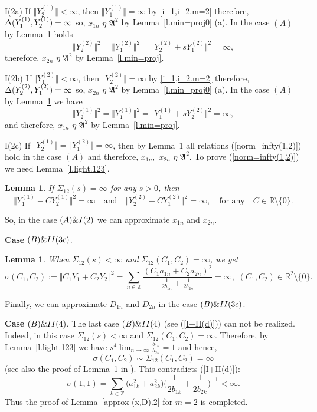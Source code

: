 \documentclass[preprint,12pt]{elsarticle}
\newcommand{\commA}[1]{\marginpar{%
\begin{color}{red}
\vskip-\baselineskip %
\raggedright\footnotesize
\itshape\hrule \smallskip A: #1\par\smallskip\hrule\end{color}}}
\newtheorem{lem}[thm]{Lemma}
\numberwithin{equation}{section}
\begin{document}
I(2a) If $\Vert Y_2^{(1)}\Vert<\infty$, then $\Vert Y_1^{(1)}\Vert=\infty$ by \eqref{i_1,i_2.m=2} therefore, 
$\Delta(Y_1^{(1)},Y_2^{(1)})\\= \infty$
so, $x_{1n}\,\,\eta\,\,{\mathfrak A}^2$ by Lemma~\ref{l.min=proj0} (a). In the case $(A)$ by Lemma~\ref{l.park} holds
$$\Vert Y_2^{(2)} \Vert^2=\Vert Y_1^{(2)} \Vert^2=\Vert Y_2^{(2)} +s Y_1^{(2)} \Vert^2=\infty,$$ therefore, 
$x_{2n}\,\,\eta\,\,{\mathfrak A}^2$ by Lemma~\ref{l.min=proj}.

I(2b) If $\Vert  Y_1^{(2)} \Vert<\infty$, then $\Vert  Y_2^{(2)} \Vert=\infty$ by \eqref{i_1,i_2.m=2} therefore,
$\Delta(Y_2^{(2)},Y_1^{(2)})\\=\infty$ so,
$x_{2n}\,\,\eta\,\,{\mathfrak A}^2$ by Lemma~\ref{l.min=proj0} (a). In the case $(A)$ by Lemma~\ref{l.park} we have
$$\Vert Y_2^{(1)} \Vert^2=\Vert Y_1^{(1)} \Vert^2=\Vert Y_1^{(1)} +s Y_2^{(2)} \Vert^2=\infty,$$
and therefore, $x_{1n}\,\,\eta\,\,{\mathfrak A}^2$ by Lemma~\ref{l.min=proj}.

I(2c) If $\Vert Y_2^{(1)} \Vert=\Vert Y_1^{(2)}\Vert=\infty$, then by Lemma~\ref{l.park} all relations (\ref{norm=infty(1,2)}) hold in the case $(A)$ and
therefore, $x_{1n},\,\,x_{2n}\,\,\eta\,\,{\mathfrak A}^2$.
To prove (\ref{norm=infty(1,2)}) we need Lemma~\ref{l.light.123}.
\begin{lem}
\label{l.park} If $\Sigma_{12}(s)=\infty$ for any $s>0$, then
$$
\Vert Y_1^{(1)}-CY_2^{(1)}\Vert^2=\infty\quad\text{and}\quad \Vert Y_2^{(2)}-CY_1^{(2)}\Vert^2=\infty,\quad\text{for any}\quad 
C\in \mathbb R\setminus\{0\}.
$$
\end{lem}
%
So, in the case ${\rm (A)\&I(2)}$  we can approximate $x_{1n}$ and $x_{2n}$.
%


{\bf Case} ${\rm (B)\&II(3c)}$.
\begin{lem}
\label{the-last} When 
%
$\Sigma_{12}(s)<\infty$ and
$\Sigma_{12}(C_1,C_2)=\infty$,
we get
\begin{equation}
\label{C_1f+C_2g=}
\sigma(C_1,C_2):=
\Vert C_1Y_1+C_2Y_2\Vert^2\!=\!\sum_{n\in {\mathbb Z}}\frac{(C_1a_{1n}+C_2a_{2n})^2}{\frac{1}{2b_{1n}}+\frac{1}{2b_{2n}}}\!=\!\infty,\,\,
(C_1,C_2)\!\in\!{\mathbb R}^2\setminus\{0\}.
\end{equation}
\end{lem}
%
Finally, we can approximate $D_{1n}$ and $D_{2n}$ in the case ${\rm (B)\&II(3c)}$.

{\bf Case} ${\rm (B)\&II(4)}$. The last case  ${\rm (B)\&II(4)}$ (see (\ref{I+II(d)})) can not be realized.
%
Indeed, in this case
$\Sigma_{12}(s)<\infty$ and $\Sigma_{12}(C_1,C_2)=\infty$. Therefore, by Lemma~\ref{l.light.123} 
we have $s^4\lim_{n\to\infty}\frac{b_{1n}}{b_{2n}}=1$ and hence,  
$$ \sigma(C_1,C_2)\sim \Sigma_{12}(C_1,C_2)=\infty
$$
(see also the proof of  Lemma~\ref{the-last}  in \cite{KosJFA14}). 
%
This contradicts (\ref{I+II(d)}):
 $$
 \sigma(1,1)=\sum_{k\in{\mathbb Z}}\big(a_{1k}^2+a_{2k}^2\big)
\Big(\frac{1}{2b_{1k}}+\frac{1}{2b_{2k}}\Big)^{-1}<\infty.
$$ Thus   the proof of Lemma~\ref{approx-(x,D).2} for $m=2$ is completed.
%
\end{document}

